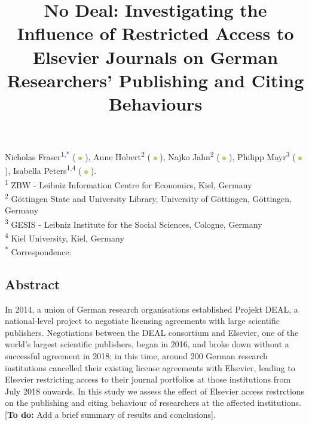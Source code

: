 \documentclass[
]{article}
\title{\vspace{-2em}No Deal: Investigating the Influence of Restricted Access to Elsevier Journals on German Researchers' Publishing and Citing Behaviours\vspace{-3em}}
\date{}
\begin{document}
\maketitle

\newcommand{\orcid}{%
  \begingroup\normalfont
  \includegraphics[height=6px]{./assets/orcid_logo.png}%
  \endgroup
}
Nicholas Fraser\textsuperscript{1,*} (\orcid{} \href{https://orcid.org/0000-0002-7582-6339}{\color{black}{0000-0002-7582-6339}}), Anne Hobert\textsuperscript{2} (\orcid{} \href{https://orcid.org/0000-0003-2429-2995}{\color{black}{0000-0003-2429-2995}}), Najko Jahn\textsuperscript{2} (\orcid{} \href{https://orcid.org/0000-0001-5105-1463}{\color{black}{0000-0001-5105-1463}}), Philipp Mayr\textsuperscript{3} (\orcid{} \href{https://orcid.org/0000-0002-6656-1658}{\color{black}{0000-0002-6656-1658}}), Isabella Peters\textsuperscript{1,4} (\orcid{} \href{https://orcid.org/0000-0001-5840-0806}{\color{black}{0000-0001-5840-0806}}). \\

\textsuperscript{1} ZBW - Leibniz Information Centre for Economics, Kiel, Germany \\
\textsuperscript{2} Göttingen State and University Library, University of Göttingen, Göttingen, Germany \\
\textsuperscript{3} GESIS - Leibniz Institute for the Social Sciences, Cologne, Germany \\
\textsuperscript{4} Kiel University, Kiel, Germany \\

\textsuperscript{*} Correspondence: \href{mailto:n.fraser@zbw.eu}{\color{black}{n.fraser@zbw.eu}} 

\hypertarget{abstract}{%
\subsection{Abstract}\label{abstract}}

In 2014, a union of German research organisations established Projekt DEAL, a national-level project to negotiate licensing agreements with large scientific publishers. Negotiations between the DEAL consortium and Elsevier, one of the world's largest scientific publishers, began in 2016, and broke down without a successful agreement in 2018; in this time, around 200 German research institutions cancelled their existing license agreements with Elsevier, leading to Elsevier restricting access to their journal portfolios at those institutions from July 2018 onwards. In this study we assess the effect of Elsevier access restrctions on the publishing and citing behaviour of researchers at the affected institutions. {[}\textbf{To do:} Add a brief summary of results and conclusions{]}.
\end{document}
